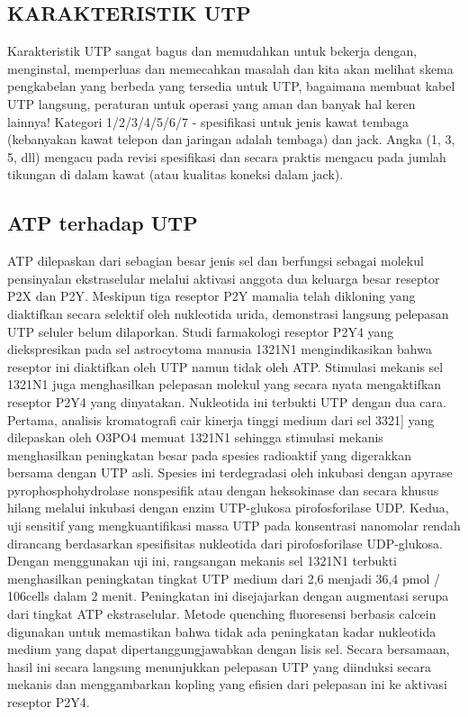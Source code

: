 \subsection{KARAKTERISTIK UTP}

Karakteristik UTP sangat bagus dan memudahkan untuk bekerja dengan, menginstal, memperluas dan memecahkan masalah dan kita akan melihat skema pengkabelan yang 
berbeda yang tersedia untuk UTP, bagaimana membuat kabel UTP langsung, peraturan untuk operasi yang aman dan banyak hal keren lainnya!
Kategori 1/2/3/4/5/6/7 - spesifikasi untuk jenis kawat tembaga (kebanyakan kawat telepon dan jaringan adalah tembaga) dan jack. Angka (1, 3, 5, dll) 
mengacu pada revisi spesifikasi dan secara praktis mengacu pada jumlah tikungan di dalam kawat (atau kualitas koneksi dalam jack).



\subsection{ATP terhadap UTP}
ATP dilepaskan dari sebagian besar jenis sel dan berfungsi sebagai molekul pensinyalan ekstraselular melalui aktivasi anggota dua keluarga besar reseptor 
P2X dan P2Y. Meskipun tiga reseptor P2Y mamalia telah dikloning yang diaktifkan secara selektif oleh nukleotida urida, demonstrasi langsung pelepasan UTP 
seluler belum dilaporkan. Studi farmakologi reseptor P2Y4 yang diekspresikan pada sel astrocytoma manusia 1321N1 mengindikasikan bahwa reseptor ini diaktifkan 
oleh UTP namun tidak oleh ATP. Stimulasi mekanis sel 1321N1 juga menghasilkan pelepasan molekul yang secara nyata mengaktifkan reseptor P2Y4 yang dinyatakan. 
Nukleotida ini terbukti UTP dengan dua cara. Pertama, analisis kromatografi cair kinerja tinggi medium dari sel 3321] yang dilepaskan oleh O3PO4 memuat 1321N1 
sehingga stimulasi mekanis menghasilkan peningkatan besar pada spesies radioaktif yang digerakkan bersama dengan UTP asli. Spesies ini terdegradasi oleh 
inkubasi dengan apyrase pyrophosphohydrolase nonspesifik atau dengan heksokinase dan secara khusus hilang melalui inkubasi dengan enzim UTP-glukosa 
pirofosforilase UDP. Kedua, uji sensitif yang mengkuantifikasi massa UTP pada konsentrasi nanomolar rendah dirancang berdasarkan spesifisitas nukleotida dari 
pirofosforilase UDP-glukosa. Dengan menggunakan uji ini, rangsangan mekanis sel 1321N1 terbukti menghasilkan peningkatan tingkat UTP medium dari 2,6 menjadi 
36,4 pmol / 106cells dalam 2 menit. Peningkatan ini disejajarkan dengan augmentasi serupa dari tingkat ATP ekstraselular. Metode quenching fluoresensi 
berbasis calcein digunakan untuk memastikan bahwa tidak ada peningkatan kadar nukleotida medium yang dapat dipertanggungjawabkan dengan lisis sel. Secara 
bersamaan, hasil ini secara langsung menunjukkan pelepasan UTP yang diinduksi secara mekanis dan menggambarkan kopling yang efisien dari pelepasan ini ke 
aktivasi reseptor P2Y4.

